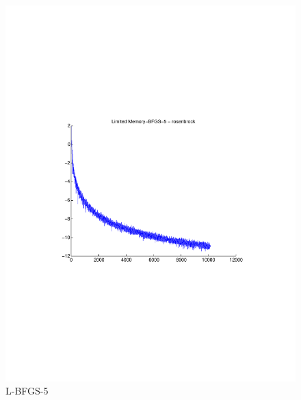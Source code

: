\documentclass[12pt]{amsart}
\begin{document}
\begin{figure}[thpb]
\centering
\includegraphics[scale=0.60]{images/rosenbrock-20/LBFGS5.pdf}
\caption{L-BFGS-5}
\label{fig:LBFGS5-rosen}
\end{figure}
\end{document}
